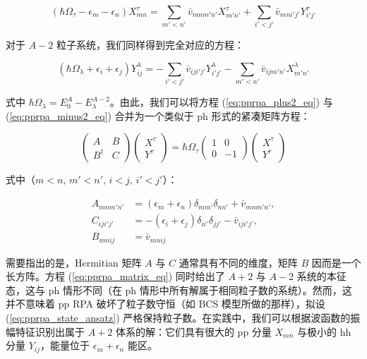 \begin{equation}
(\hbar\Omega_{\tau}-\epsilon_{m}-\epsilon_{n})X^{\tau}_{mn}=\sum_{m'<n'}\bar{v}_{mnm'n'}X^{\tau}_{m'n'}+\sum_{i'<j'}\bar{v}_{mni'j'}Y^{\tau}_{i'j'}\label{eq:pprpa_plus2_eq}
\end{equation}

对于 $A-2$ 粒子系统，我们同样得到完全对应的方程：

\begin{equation}
(\hbar\Omega_{\lambda}+\epsilon_{i}+\epsilon_{j})Y^{\lambda}_{ij}=-\sum_{i'<j'}\bar{v}_{iji'j'}Y^{\lambda}_{i'j'}-\sum_{m'<n'}\bar{v}_{ijm'n'}X^{\lambda}_{m'n'}\label{eq:pprpa_minus2_eq}
\end{equation}

式中 $\hbar\Omega_{\lambda}=E^{A}_{0}-E^{A-2}_{\lambda}$。由此，我们可以将方程
(\ref{eq:pprpa_plus2_eq}) 与 (\ref{eq:pprpa_minus2_eq}) 合并为一个类似于
ph 形式的紧凑矩阵方程：

\begin{equation}
\begin{pmatrix}A & B\\
B^{\dagger} & C
\end{pmatrix}\begin{pmatrix}X^{\tau}\\
Y^{\tau}
\end{pmatrix}=\hbar\Omega_{\tau}\begin{pmatrix}1 & 0\\
0 & -1
\end{pmatrix}\begin{pmatrix}X^{\tau}\\
Y^{\tau}
\end{pmatrix}\label{eq:pprpa_matrix_eq}
\end{equation}

式中（$m<n,\,m'<n',\,i<j,\,i'<j'$）：

\begin{align}
A_{mnm'n'} & =(\epsilon_{m}+\epsilon_{n})\delta_{mm'}\delta_{nn'}+\bar{v}_{mnm'n'},\nonumber \\
C_{iji'j'} & =-(\epsilon_{i}+\epsilon_{j})\delta_{ii'}\delta_{jj'}-\bar{v}_{iji'j'},\nonumber \\
B_{mnij} & =\bar{v}_{mnij}\label{eq:pprpa_matrix_blocks}
\end{align}

需要指出的是，Hermitian 矩阵 $A$ 与 $C$ 通常具有不同的维度，矩阵 $B$ 因而是一个长方阵。方程 (\ref{eq:pprpa_matrix_eq})
同时给出了 $A+2$ 与 $A-2$ 系统的本征态，这与 ph 情形不同（在 ph 情形中所有解属于相同粒子数的系统）。然而，这并不意味着
pp RPA 破坏了粒子数守恒（如 BCS 模型所做的那样），拟设 (\ref{eq:pprpa_state_ansatz}) 严格保持粒子数。在实践中，我们可以根据波函数的振幅特征识别出属于
$A+2$ 体系的解：它们具有很大的 pp 分量 $X_{mn}$ 与极小的 hh 分量 $Y_{ij}$，能量位于 $\epsilon_{m}+\epsilon_{n}$
能区。

